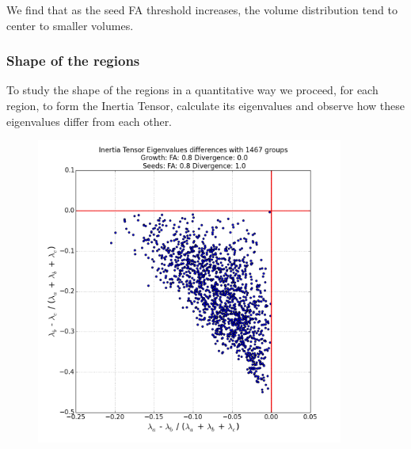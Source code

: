 \documentclass[12pt]{article}
\begin{document}
\begin{par}
We find that as the seed FA threshold increases, the volume distribution tend to center to smaller volumes.
\end{par}

\subsubsection{Shape of the regions}
\begin{par}
To study the shape of the regions in a quantitative way we proceed, for each region, to form the Inertia Tensor, calculate its eigenvalues and observe how these eigenvalues differ from each other.
\end{par}

\begin{figure}[ht]
\centering
\begin{minipage}{.5\textwidth}
  \centering
  \includegraphics[width=0.9\textwidth]{groups/inertiaplots/inertia_diff_08_Trace_10_search_FA_08_Trace_00.png} %
\end{minipage}%
\begin{minipage}{.5\textwidth}
  \centering

\end{minipage}
\end{figure}
\end{document}
